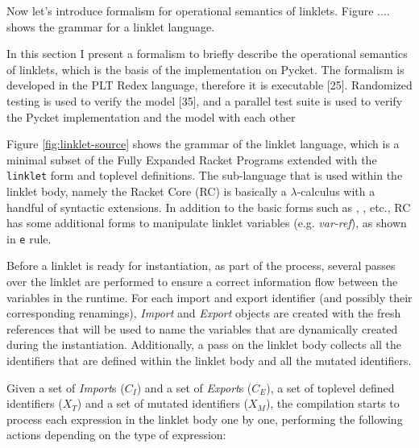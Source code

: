 		\begin{paragraph-here}
			Now let's introduce formalism for operational semantics of linklets. Figure .... shows the grammar for a linklet language.

			In this section I present a formalism to briefly describe the operational semantics of linklets, which is the basis of the implementation on Pycket. The formalism is developed in the PLT Redex language, therefore it is executable [25]. Randomized testing is used to verify the model [35], and a parallel test suite is used to verify the Pycket implementation and the model with each other
		\end{paragraph-here}


		\begin{paragraph-here}
			Figure \ref{fig:linklet-source} shows the grammar of the linklet
			language, which is a minimal subset of the Fully Expanded Racket
			Programs extended with the \verb|linklet| form and toplevel
			definitions. The sub-language that is used within the linklet body,
			namely the Racket Core (RC) is basically a $\lambda$-calculus with a handful
			of syntactic extensions. In addition to the basic forms such
			as , ,  etc., RC has
			some additional forms to manipulate linklet variables
			(e.g. \emph{var-ref}), as shown in \verb|e| rule. %
		\end{paragraph-here}

		\begin{paragraph-here}
			Before a linklet is ready for instantiation, as part of the
			 process, several passes over the linklet are
			performed to ensure a correct information flow between the variables
			in the run\dash time. For each import and export identifier (and
			possibly their corresponding renamings), \emph{Import} and
			\emph{Export} objects are created with the fresh references that
			will be used to name the variables that are dynamically created during
			the instantiation. Additionally, a pass on the linklet body collects
			all the identifiers that are defined within the linklet body and all
			the mutated identifiers.
		\end{paragraph-here}



		\begin{paragraph-here}
			Given a set of \emph{Import}s ($\mathit{C_I}$) and a set of
			\emph{Export}s ($\mathit{C_E}$), a set of toplevel defined
			identifiers ($\mathit{X_T}$) and a set of mutated identifiers
			($\mathit{X_M}$), the compilation starts to process each expression in
			the linklet body one by one, performing the following actions
			depending on the type of expression:

		\end{paragraph-here}

